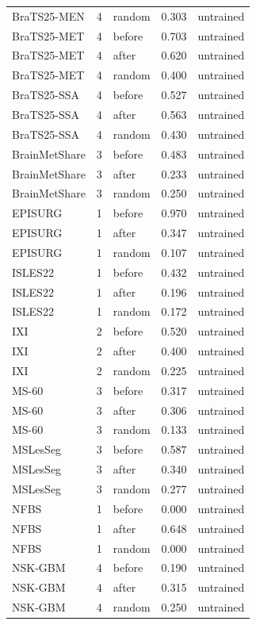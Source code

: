 \begin{tabular}{lrlrl}
BraTS25-MEN & 4 & random & 0.303 & untrained \\
BraTS25-MET & 4 & before & 0.703 & untrained \\
BraTS25-MET & 4 & after & 0.620 & untrained \\
BraTS25-MET & 4 & random & 0.400 & untrained \\
BraTS25-SSA & 4 & before & 0.527 & untrained \\
BraTS25-SSA & 4 & after & 0.563 & untrained \\
BraTS25-SSA & 4 & random & 0.430 & untrained \\
BrainMetShare & 3 & before & 0.483 & untrained \\
BrainMetShare & 3 & after & 0.233 & untrained \\
BrainMetShare & 3 & random & 0.250 & untrained \\
EPISURG & 1 & before & 0.970 & untrained \\
EPISURG & 1 & after & 0.347 & untrained \\
EPISURG & 1 & random & 0.107 & untrained \\
ISLES22 & 1 & before & 0.432 & untrained \\
ISLES22 & 1 & after & 0.196 & untrained \\
ISLES22 & 1 & random & 0.172 & untrained \\
IXI & 2 & before & 0.520 & untrained \\
IXI & 2 & after & 0.400 & untrained \\
IXI & 2 & random & 0.225 & untrained \\
MS-60 & 3 & before & 0.317 & untrained \\
MS-60 & 3 & after & 0.306 & untrained \\
MS-60 & 3 & random & 0.133 & untrained \\
MSLesSeg & 3 & before & 0.587 & untrained \\
MSLesSeg & 3 & after & 0.340 & untrained \\
MSLesSeg & 3 & random & 0.277 & untrained \\
NFBS & 1 & before & 0.000 & untrained \\
NFBS & 1 & after & 0.648 & untrained \\
NFBS & 1 & random & 0.000 & untrained \\
NSK-GBM & 4 & before & 0.190 & untrained \\
NSK-GBM & 4 & after & 0.315 & untrained \\
NSK-GBM & 4 & random & 0.250 & untrained \\

\end{tabular}
